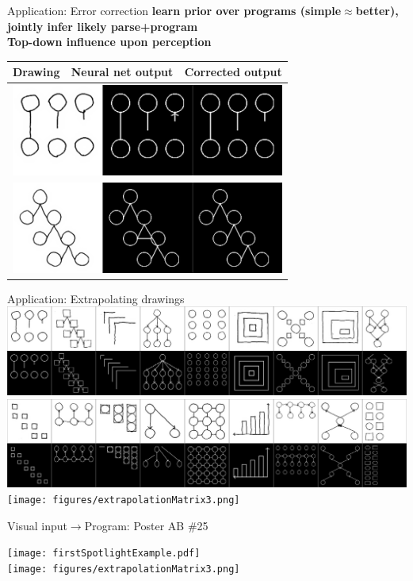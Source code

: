 \documentclass[aspectratio=169,final]{beamer}
\begin{document}
\begin{frame}{Application: Error correction}
  \textbf{learn prior over programs (simple$\approx$better), jointly infer likely parse+program}\\
  \textbf{Top-down influence upon perception}
  
  \vspace{0.4cm}
  
\def\arraystretch{0.0}
  \centering\begin{tabular}{p{3cm}p{3cm}p{3cm}}
\toprule     \centering Drawing&Neural net output&Corrected output\\\midrule 
\multicolumn{3}{c}{        \includegraphics[width = 9cm]{figures/programSuccess7.png} }\\
\multicolumn{3}{c}{        \includegraphics[width = 9cm]{figures/programSuccess16.png} }

    \end{tabular}

\end{frame}

\begin{frame}{Application: Extrapolating drawings}
  \centering  \includegraphics[height = 0.3\textheight]{figures/extrapolationMatrix1.png}
\\  \includegraphics[height = 0.3\textheight]{figures/extrapolationMatrix2.png}
\\  \texttt{[image: figures/extrapolationMatrix3.png]}  


\end{frame}

\begin{frame}{\Huge Visual input$\to$Program: Poster AB \#25}

  \centering  \texttt{[image: firstSpotlightExample.pdf]}
  \vspace{1cm}
\\\centering  \texttt{[image: figures/extrapolationMatrix3.png]}  

  \end{frame}
\end{document}
